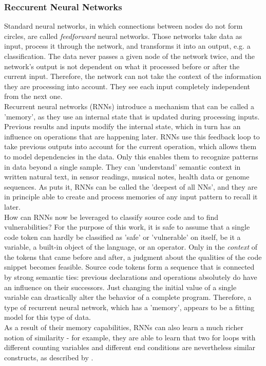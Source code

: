 \documentclass[
	a4paper,
	pagesize,
	pdftex,
	12pt,
	twoside, %
	BCOR=5mm, %
	ngerman,
	fleqn,
	final,
	]{scrartcl}
\begin{document}
\subsubsection{Reccurent Neural Networks}\label{RNN}
Standard neural networks, in which connections between nodes do not form circles, are called \textit{feedforward} neural networks. Those networks take data as input, process it through the network, and transforms it into an output, e.g. a classification. The data never passes a given node of the network twice, and the network's output is not dependent on what it processed before or after the current input. Therefore, the network can not take the context of the information they are processing into account. They see each input completely independent from the next one.\\
Recurrent neural networks (RNNs) introduce a mechanism that can be called a 'memory', as they use an internal state that is updated during processing inputs. Previous results and inputs modify the internal state, which in turn has an influence on operations that are happening later. RNNs use this feedback loop to take previous outputs into account for the current operation, which allows them to model dependencies in the data. Only this enables them to recognize patterns in data beyond a single sample. They can 'understand' semantic context in written natural text, in sensor readings, musical notes, health data or genome sequences. As \cite{Schmidhuber.2015} puts it, RNNs can be called the 'deepest of all NNs', and they are in principle able to create and process memories of any input pattern to recall it later.\\
How can RNNs now be leveraged to classify source code and to find vulnerabilities? For the purpose of this work, it is safe to assume that a single code token can hardly be classified as 'safe' or 'vulnerable' on itself, be it a variable, a built-in object of the language, or an operator. Only in the \textit{context} of the tokens that came before and after, a judgment about the qualities of the code snippet becomes feasible. Source code tokens form a sequence that is connected by strong semantic ties: previous declarations and operations absolutely do have an influence on their successors. Just changing the initial value of a single variable can drastically alter the behavior of a complete program. Therefore, a type of recurrent neural network, which has a 'memory', appears to be a fitting model for this type of data.\\
As a result of their memory capabilities, RNNs can also learn a much richer notion of similarity - for example, they are able to learn that two for loops with different counting variables and different end conditions are nevertheless similar constructs, as described by \cite{Allamanis.2018}. \\
\end{document}

